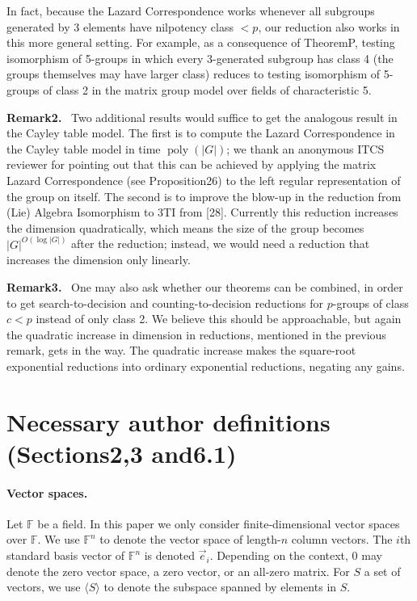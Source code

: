 \documentclass[10pt,a4paper]{article}
\newenvironment{authorclaim}[1]{\par\medskip\noindent\textbf{#1.}\ }{\par\medskip}
\begin{document}
In fact, because the Lazard Correspondence works whenever all subgroups generated by 3 elements have nilpotency class $<p$, our reduction also works in this more general setting. For example, as a consequence of TheoremP, testing isomorphism of 5-groups in which every 3-generated subgroup has class 4 (the groups themselves may have larger class) reduces to testing isomorphism of 5-groups of class 2 in the matrix group model over fields of characteristic 5.
\begin{authorclaim}{Remark2}
Two additional results would suffice to get the analogous result in the Cayley table model. The first is to compute the Lazard Correspondence in the Cayley table model in time $\operatorname{poly}(|G|)$; we thank an anonymous ITCS reviewer for pointing out that this can be achieved by applying the matrix Lazard Correspondence (see Proposition26) to the left regular representation of the group on itself. The second is to improve the blow-up in the reduction from (Lie) Algebra Isomorphism to 3TI from [28]. Currently this reduction increases the dimension quadratically, which means the size of the group becomes $|G|^{O(\log|G|)}$ after the reduction; instead, we would need a reduction that increases the dimension only linearly.
\end{authorclaim}
\begin{authorclaim}{Remark3}
One may also ask whether our theorems can be combined, in order to get search-to-decision and counting-to-decision reductions for $p$-groups of class $c<p$ instead of only class 2. We believe this should be approachable, but again the quadratic increase in dimension in reductions, mentioned in the previous remark, gets in the way. The quadratic increase makes the square-root exponential reductions into ordinary exponential reductions, negating any gains.
\end{authorclaim}
\section*{Necessary author definitions (Sections2,3 and6.1)}
\paragraph{Vector spaces.} Let $\mathbb F$ be a field. In this paper we only consider finite-dimensional vector spaces over $\mathbb F$. We use $\mathbb F^n$ to denote the vector space of length-$n$ column vectors. The $i$th standard basis vector of $\mathbb F^n$ is denoted $\vec e_i$. Depending on the context, 0 may denote the zero vector space, a zero vector, or an all-zero matrix. For $S$ a set of vectors, we use $\langle S\rangle$ to denote the subspace spanned by elements in $S$.
\end{document}
